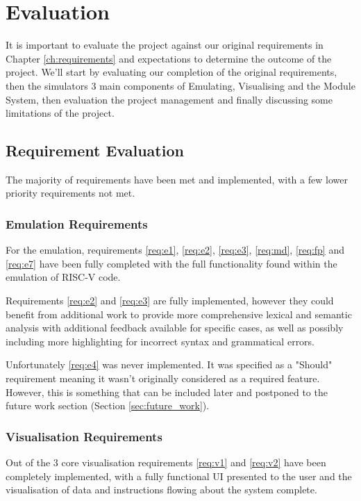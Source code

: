 \chapter{Evaluation}
\label{ch:evaluation}
It is important to evaluate the project against our original requirements in Chapter \ref{ch:requirements} and expectations to determine the outcome of the project. We'll start by evaluating our completion of the original requirements, then the simulators 3 main components of Emulating, Visualising and the Module System, then evaluation the project management and finally discussing some limitations of the project.

\section{Requirement Evaluation}
The majority of requirements have been met and implemented, with a few lower priority requirements not met.

\subsection{Emulation Requirements}
For the emulation, requirements \ref{req:e1}, \ref{req:e2}, \ref{req:e3}, \ref{req:md}, \ref{req:fp} and \ref{req:e7} have been fully completed with the full functionality found within the emulation of RISC-V code.

Requirements \ref{req:e2} and \ref{req:e3} are fully implemented, however they could benefit from additional work to provide more comprehensive lexical and semantic analysis with additional feedback available for specific cases, as well as possibly including more highlighting for incorrect syntax and grammatical errors.

Unfortunately \ref{req:e4} was never implemented. It was specified as a "Should" requirement meaning it wasn't originally considered as a required feature. However, this is something that can be included later and postponed to the future work section (Section \ref{sec:future_work}).

\subsection{Visualisation Requirements}
Out of the 3 core visualisation requirements \ref{req:v1} and \ref{req:v2} have been completely implemented, with a fully functional \ac{UI} presented to the user and the visualisation of data and instructions flowing about the system complete.


